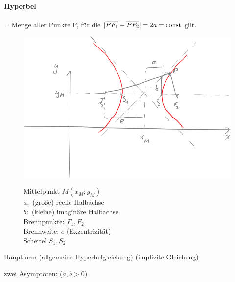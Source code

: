 \begin{enumerate}[A)]
	\paragraph{Hyperbel} = Menge aller Punkte P, für die $|\overline{PF_1}-\overline{PF_2}| = 2a = \text{const}$ gilt.
	\begin{figure}[h!]
		\begin{minipage}{9cm}
			\includegraphics[width=\linewidth]{Bilder/124}
			\caption{}
		\end{minipage}
		\quad
		\begin{minipage}{\linewidth-9cm - 1em}
			Mittelpunkt $M(x_M;y_M)$\\
			$a:$ (große) reelle Halbachse\\
			$b:$ (kleine) imaginäre Halbachse\\
			Brennpunkte: $F_1,F_2$\\
			Brennweite: $e$ (Exzentrizität)\\
			Scheitel $S_1,S_2$
		\end{minipage}
	\end{figure}
	
	
	\ul{Hauptform} (allgemeine Hyperbelgleichung)
	 (implizite Gleichung)
	
	zwei Asymptoten: \quad ($a,b > 0$)
	

\end{enumerate}

